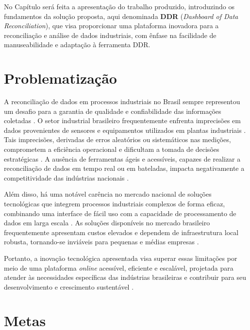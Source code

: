\label{Apresentacao}

No Capítulo  será feita a apresentação do trabalho produzido, introduzindo os fundamentos da solução proposta, aqui denominada \textbf{DDR} (\textit{Dashboard of Data Reconciliation}), que visa proporcionar uma plataforma inovadora para a reconciliação e análise de dados industriais, com ênfase na facilidade de manuseabilidade e adaptação à ferramenta DDR.

\section{Problematização}

A reconciliação de dados em processos industriais no Brasil sempre representou um desafio para a garantia de qualidade e confiabilidade das informações coletadas \cite{datarecshakar}. O setor industrial brasileiro frequentemente enfrenta imprecisões em dados provenientes de sensores e equipamentos utilizados em plantas industriais \cite{produtividadeindustria}. Tais imprecisões, derivadas de erros aleatórios ou sistemáticos nas medições, comprometem a eficiência operacional e dificultam a tomada de decisões estratégicas \cite{datarecsurvey}. A ausência de ferramentas ágeis e acessíveis, capazes de realizar a reconciliação de dados em tempo real ou em bateladas, impacta negativamente a competitividade das indústrias nacionais \cite{industry4status}.

Além disso, há uma notável carência no mercado nacional de soluções tecnológicas que integrem processos industriais complexos de forma eficaz, combinando uma interface de fácil uso com a capacidade de processamento de dados em larga escala \cite{danielhoduin}. As soluções disponíveis no mercado brasileiro frequentemente apresentam custos elevados e dependem de infraestrutura local robusta, tornando-se inviáveis para pequenas e médias empresas \cite{industryinternet}. 

Portanto, a inovação tecnológica apresentada visa superar essas limitações por meio de uma plataforma \textit{online} acessível, eficiente e escalável, projetada para atender às necessidades específicas das indústrias brasileiras e contribuir para seu desenvolvimento e crescimento sustentável \cite{reconset}.

\section{Metas}

